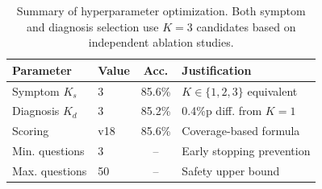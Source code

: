 \begin{table}[t]
\centering
\caption{Summary of hyperparameter optimization. Both symptom and diagnosis selection use $K=3$ candidates based on independent ablation studies.}
\label{tab:hyperparams}
\begin{tabular}{llcl}
\toprule
\textbf{Parameter} & \textbf{Value} & \textbf{Acc.} & \textbf{Justification} \\
\midrule
Symptom $K_s$ & 3 & 85.6\% & $K \in \{1,2,3\}$ equivalent \\
Diagnosis $K_d$ & 3 & 85.2\% & 0.4\%p diff. from $K=1$ \\
Scoring & v18 & 85.6\% & Coverage-based formula \\
Min. questions & 3 & -- & Early stopping prevention \\
Max. questions & 50 & -- & Safety upper bound \\
\bottomrule
\end{tabular}
\end{table}
